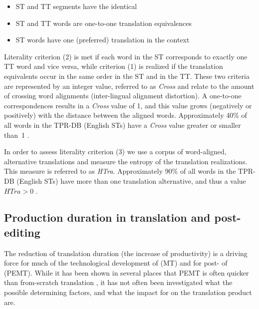 \documentclass[output=paper]{LSP/langsci}
\begin{document}
\begin{itemize}
\item ST and TT segments have the identical 
\item ST and TT words are one-to-one translation equivalences
\item ST words have one (preferred) translation in the context
\end{itemize}

Literality criterion (2) is met if each word in the ST corresponds to exactly one TT word and vice versa, while criterion (1) is realized if the translation equivalents occur in the same order in the ST and in the TT. These two criteria are represented by an integer value, referred to as \textit{Cross} and relate to the amount of crossing word alignments (inter-lingual alignment distortion). A one-to-one correspondences results in a \textit{Cross} value of 1, and this value grows (negatively or positively) with the distance between the aligned words.  Approximately 40\% of all words in the TPR-DB (English STs) have a \textit{Cross} value greater or smaller than~1 \citep[190]{Schaeffer2016Word}. 

In order to assess literality criterion (3) we use a corpus of word-aligned, alternative translations and measure the entropy of the translation realizations. This measure is referred to as  \textit{HTra}. Approximately 90\% of all words in the TPR-DB (English STs) have more than one translation alternative, and thus a value   $\textit{HTra} > 0$ \citep[190]{Schaeffer2016Word}.

\subsection{Production duration in translation and post-editing}
\label{carl-schaeffer:sec:4.2}

The reduction of translation duration (the increase of productivity) is a driving force for much of the technological development of  (MT) and for post- of  (PEMT). While it has been shown in several places that PEMT is often quicker than from-scratch translation \citep{Plitt2010,Obrien2014PostEditing}, it has not often been investigated what the possible determining factors, and what the impact for on the translation product are. 
\end{document}
